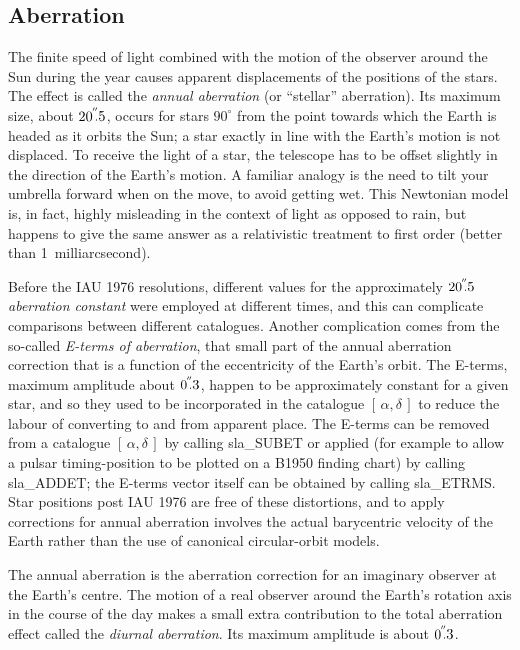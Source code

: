 \documentclass[11pt,twoside]{article}
\newcommand{\radec}     {$[\,\alpha,\delta\,]$}
\newcommand{\arcsec}[2] {\arcseci{#1}$\hspace{-0.4em}.#2$}
\newcommand{\arcsec}[2] {
      {$#1\hspace{-0.05em}^{'\hspace{-0.1em}'}\hspace{-0.4em}.#2$}
   }
\newcommand{\arcseci}[1] {$#1\hspace{-0.05em}$\raisebox{-0.5ex}
                         {$^{'\hspace{-0.1em}'}$}}
\renewcommand{\arcseci}[1] {$#1\hspace{-0.05em}^{'\hspace{-0.1em}'}$}
\begin{document}
\subsection{Aberration}
The finite speed of light combined with the motion of the observer
around the Sun during the year causes apparent displacements of
the positions of the stars.  The effect is called
the {\it annual aberration} (or ``stellar''
aberration).  Its maximum size, about \arcsec{20}{5},
occurs for stars $90^{\circ}$ from the point towards which
the Earth is headed as it orbits the Sun;  a star exactly in line with
the Earth's motion is not displaced.  To receive the light of
a star, the telescope has to be offset slightly in the direction of
the Earth's motion.  A familiar analogy is the need to tilt your
umbrella forward when on the move, to avoid getting wet.  This
Newtonian model is,
in fact, highly misleading in the context of light as opposed
to rain, but happens to give the same answer as a relativistic
treatment to first order (better than 1~milliarcsecond).

Before the IAU 1976 resolutions, different
values for the approximately
\arcsec{20}{5} {\it aberration constant}\/ were employed
at different times, and this can complicate comparisons
between different catalogues.  Another complication comes from
the so-called {\it E-terms of aberration},
that small part of the annual aberration correction that is a
function of the eccentricity of the Earth's orbit.  The E-terms,
maximum amplitude about \arcsec{0}{3},
happen to be approximately constant for a given star, and so they
used to be incorporated in the catalogue \radec\/
to reduce the labour of converting to and from apparent place.
The E-terms can be removed from a catalogue \radec\/ by
calling
sla\_SUBET
or applied (for example to allow a pulsar
timing-position to be plotted on a B1950 finding chart)
by calling
sla\_ADDET;
the E-terms vector itself can be obtained by calling
sla\_ETRMS.
Star positions post IAU 1976 are free of these distortions, and to
apply corrections for annual aberration involves the actual
barycentric velocity of the Earth rather than the use of
canonical circular-orbit models.

The annual aberration is the aberration correction for
an imaginary observer at the Earth's centre.
The motion of a real observer around the Earth's rotation axis in
the course of the day makes a small extra contribution to the total
aberration effect called the {\it diurnal aberration}.  Its
maximum amplitude is about \arcsec{0}{3}.
\end{document}
